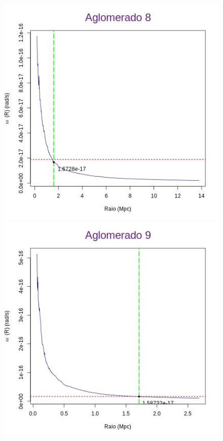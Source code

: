 \begin{anexosenv}
\begin{figure}[H]
\begin{center}
\includegraphics[scale=.3]{04-figuras/selec20/perfil08}
\includegraphics[scale=.3]{04-figuras/selec20/perfil09}

\end{center}
\end{figure}
\end{anexosenv}
